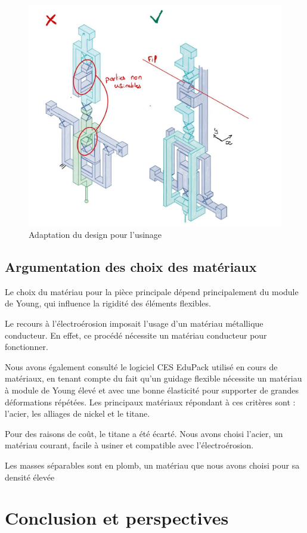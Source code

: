 \documentclass[a4paper, 11pt]{article} %
\begin{document}
\begin{figure}[H]
    \centering
    \includegraphics[width=0.75\linewidth]{images/electroeriosion.jpg}
    \caption{Adaptation du design pour l'usinage}
        \label{fig:electroeriosion}
\end{figure}


\subsection{Argumentation des choix des matériaux}
Le choix du matériau pour la pièce principale dépend principalement du module de Young, qui influence la rigidité des éléments flexibles.

Le recours à l’électroérosion imposait l’usage d’un matériau métallique conducteur. En effet, ce procédé nécessite un matériau conducteur pour fonctionner.

Nous avons également consulté le logiciel CES EduPack utilisé en cours de matériaux, en tenant compte du fait qu’un guidage flexible nécessite un matériau à module de Young élevé et avec une bonne élasticité pour supporter de grandes déformations répétées. Les principaux matériaux répondant à ces critères sont : l’acier, les alliages de nickel et le titane.

Pour des raisons de coût, le titane a été écarté. Nous avons choisi l’acier, un matériau courant, facile à usiner et compatible avec l’électroérosion.

Les masses séparables sont en plomb, un matériau que nous avons choisi pour sa densité élevée




\section{Conclusion et perspectives}
\end{document}
